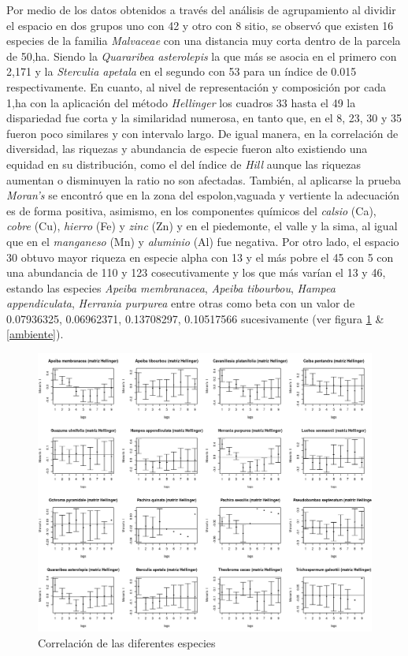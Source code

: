 \documentclass[11pt,]{article}
\begin{document}
Por medio de los datos obtenidos a través del análisis de agrupamiento
al dividir el espacio en dos grupos uno con 42 y otro con 8 sitio, se
observó que existen 16 especies de la familia \emph{Malvaceae} con una
distancia muy corta dentro de la parcela de 50,ha. Siendo la
\emph{Quararibea asterolepis} la que más se asocia en el primero con
2,171 y la \emph{Sterculia apetala} en el segundo con 53 para un índice
de 0.015 respectivamente. En cuanto, al nivel de representación y
composición por cada 1,ha con la aplicación del método \emph{Hellinger}
los cuadros 33 hasta el 49 la dispariedad fue corta y la similaridad
numerosa, en tanto que, en el 8, 23, 30 y 35 fueron poco similares y con
intervalo largo. De igual manera, en la correlación de diversidad, las
riquezas y abundancia de especie fueron alto existiendo una equidad en
su distribución, como el del índice de \emph{Hill} aunque las riquezas
aumentan o disminuyen la ratio no son afectadas. También, al aplicarse
la prueba \emph{Moran's} se encontró que en la zona del espolon,vaguada
y vertiente la adecuación es de forma positiva, asimismo, en los
componentes químicos del \emph{calsio} (Ca), \emph{cobre} (Cu),
\emph{hierro} (Fe) y \emph{zinc} (Zn) y en el piedemonte, el valle y la
sima, al igual que en el \emph{manganeso} (Mn) y \emph{aluminio} (Al)
fue negativa. Por otro lado, el espacio 30 obtuvo mayor riqueza en
especie alpha con 13 y el más pobre el 45 con 5 con una abundancia de
110 y 123 cosecutivamente y los que más varían el 13 y 46, estando las
especies \emph{Apeiba membranacea}, \emph{Apeiba tibourbou},
\emph{Hampea appendiculata}, \emph{Herrania purpurea} entre otras como
beta con un valor de 0.07936325, 0.06962371, 0.13708297, 0.10517566
sucesivamente (ver figura \ref{diversidad} \& \ref{ambiente}).

\begin{figure}
\centering
\includegraphics[width=1.00000\textwidth]{ecologia_espacial_files/figure-markdown_github/unnamed-chunk-10-1.png}
\caption{Correlación de las diferentes especies\label{diversidad}}
\end{figure}
\end{document}
